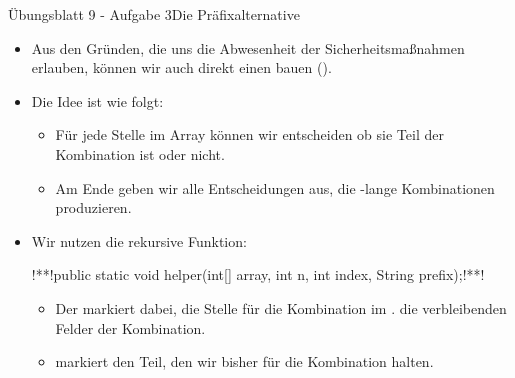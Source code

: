 \iffull
\begin{frame}[fragile]{Übungsblatt 9 - Aufgabe 3\hfill Die Präfixalternative}
\hypertarget<1>{prefixalt}{}\begin{itemize}[<+(1)->]
        \item Aus den Gründen, die uns die Abwesenheit der Sicherheitsmaßnahmen erlauben, können wir auch direkt einen  bauen ().
        \item Die Idee  ist wie folgt: \begin{itemize}
            \item Für jede Stelle im Array können wir entscheiden ob sie Teil der Kombination ist oder nicht.
            \item Am Ende  geben wir alle Entscheidungen aus, die -lange Kombinationen produzieren.
        \end{itemize}
        \item Wir nutzen die rekursive  Funktion:
\begin{plainjava}
!**!public static void helper(int[] array, int n, int index, String prefix);!**!
\end{plainjava}
\begin{itemize}
    \item<8-> Der  markiert dabei, die Stelle für die Kombination im .  die verbleibenden Felder der Kombination.
    \item<9->  markiert den Teil, den wir bisher für die Kombination halten.
\end{itemize}
    \end{itemize}
\end{frame}

